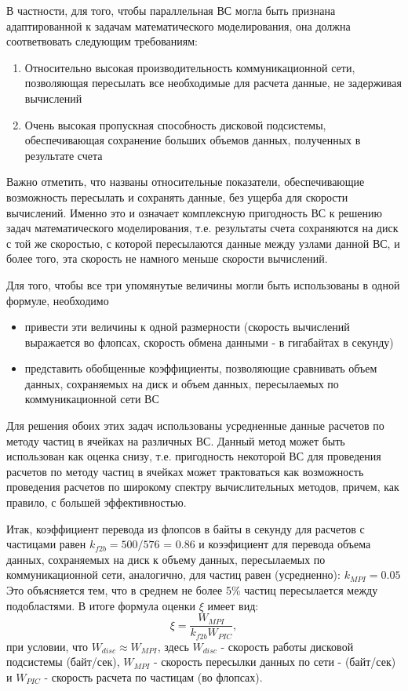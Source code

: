 В частности, для того, чтобы параллельная ВС могла быть признана адаптированной к задачам математического моделирования, она должна соответвовать следующим требованиям:
\begin{enumerate}
	\item Относительно высокая производительность коммуникационной сети, позволяющая пересылать все необходимые для расчета данные, не задерживая вычислений
	\item Очень высокая пропускная способность дисковой подсистемы, обеспечивающая сохранение больших объемов данных, полученных в результате счета  	
\end{enumerate}

Важно отметить, что названы относительные показатели, обеспечивающие возможность пересылать и сохранять данные, без ущерба для скорости вычислений. Именно это и означает  комплексную пригодность ВС к решению задач математического моделирования, т.е. результаты счета сохраняются на диск с той же скоростью, с которой пересылаются данные между узлами данной ВС, и более того, эта скорость не намного меньше скорости вычислений.

Для того, чтобы все три упомянутые величины могли быть использованы в одной формуле, необходимо 
\begin{itemize}
	\item привести эти величины к одной размерности (скорость вычислений выражается во флопсах, скорость обмена данными - в гигабайтах в секунду)
	\item представить обобщенные коэффициенты, позволяющие сравнивать объем данных, сохраняемых на диск и объем данных, пересылаемых по коммуникационной сети ВС  
\end{itemize}


Для решения обоих этих задач использованы усредненные данные расчетов по методу частиц в ячейках на различных ВС. Данный метод может быть использован как оценка снизу, т.е. пригодность некоторой ВС для проведения расчетов по методу частиц в ячейках может трактоваться как возможность проведения расчетов по широкому спектру вычислительных методов, причем, как правило, с большей эффективностью.

Итак, коэффициент перевода из флопсов в байты в секунду для расчетов с частицами равен
$k_{f2b} = 500/576$ = 0.86   
и коээфициент для перевода объема данных, сохраняемых на диск к объему данных, пересылаемых по коммуникационной сети, аналогично, для частиц равен (усредненно):
$k_{MPI} = 0.05$ 
Это объясняется тем, что в среднем не более 5\% частиц пересылается между подобластями.
В итоге формула оценки $\xi$ имеет вид:
$$
\xi = \frac{W_{MPI}} {k_{f2b} W_{PIC}}, 
$$
при условии, что $W_{disc} \approx W_{MPI}$,
здесь $W_{disc}$ - скорость работы дисковой подсистемы (байт/сек), $W_{MPI}$
- скорость пересылки данных по сети - (байт/сек) и $W_{PIC}$ - скорость расчета по частицам (во флопсах).	

